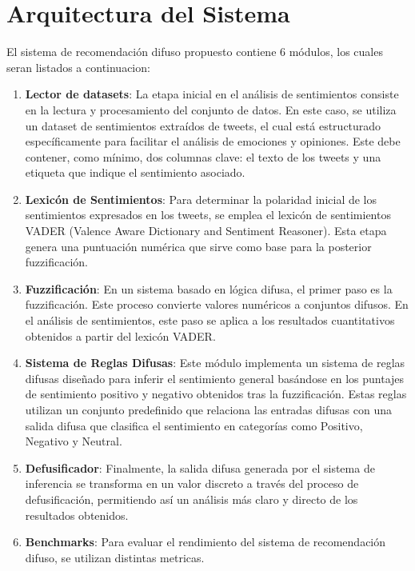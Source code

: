 \documentclass[sigconf, review=false, nonacm]{acmart}
\begin{document}
\section{Arquitectura del Sistema}

El sistema de recomendación difuso propuesto contiene 6 módulos, los cuales seran listados a continuacion:
\begin{enumerate}
	\item \textbf{Lector de datasets}: La etapa inicial en el análisis de sentimientos consiste en la lectura
	      y procesamiento del conjunto de datos. En este caso, se utiliza un dataset de sentimientos extraídos
	      de tweets, el cual está estructurado específicamente para facilitar el análisis de emociones y
	      opiniones. Este debe contener, como mínimo, dos columnas clave: el texto de los tweets y una etiqueta
	      que indique el sentimiento asociado.

	\item \textbf{Lexicón de Sentimientos}: Para determinar la polaridad inicial de los sentimientos
	      expresados en los tweets, se emplea el lexicón de sentimientos VADER (Valence Aware Dictionary and
	      Sentiment Reasoner). Esta etapa genera una puntuación numérica que sirve como base para la posterior
	      fuzzificación.

	\item \textbf{Fuzzificación}: En un sistema basado en lógica difusa, el primer paso es la fuzzificación.
	      Este proceso convierte valores numéricos a conjuntos difusos. En el análisis de sentimientos, este
	      paso se aplica a los resultados cuantitativos obtenidos a partir del lexicón VADER.

	\item \textbf{Sistema de Reglas Difusas}: Este módulo implementa un sistema de reglas difusas diseñado
	      para inferir el sentimiento general basándose en los puntajes de sentimiento positivo y negativo
	      obtenidos tras la fuzzificación. Estas reglas utilizan un conjunto predefinido que relaciona las
	      entradas difusas con una salida difusa que clasifica el sentimiento en categorías como Positivo,
	      Negativo y Neutral.

	\item \textbf{Defusificador}: Finalmente, la salida difusa generada por el sistema de inferencia se
	      transforma en un valor discreto a través del proceso de defusificación, permitiendo así un análisis
	      más claro y directo de los resultados obtenidos.

	\item \textbf{Benchmarks}: Para evaluar el rendimiento del sistema de recomendación difuso, se utilizan
	      distintas metricas. %
\end{enumerate}
\end{document}
